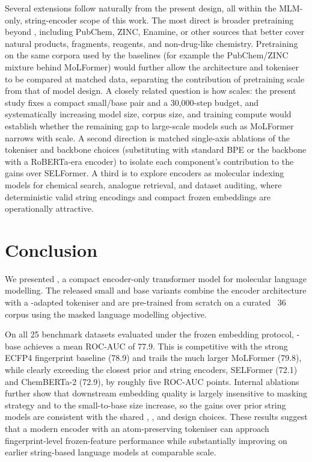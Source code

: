 \documentclass[11pt,a4paper]{article}
\begin{document}
Several extensions follow naturally from the present design, all within the
MLM-only, string-encoder scope of this work. The most direct is broader
pretraining beyond \chembl{}, including PubChem, ZINC, Enamine, or other
sources that better cover natural products, fragments, reagents, and
non-drug-like chemistry. Pretraining \model{} on the same corpora used by the
baselines (for example the PubChem/ZINC mixture behind MoLFormer) would
further allow the architecture and tokeniser to be compared at matched data,
separating the contribution of pretraining scale from that of model design. A
closely related question is how \model{} scales: the present study fixes a
compact small/base pair and a 30{,}000-step budget, and systematically
increasing model size, corpus size, and training compute would establish
whether the remaining gap to large-scale \smiles{} models such as MoLFormer
narrows with scale. A second direction is matched single-axis ablations
of the tokeniser and backbone choices (substituting \ape{} with standard BPE
or the \modernbert{} backbone with a RoBERTa-era encoder) to isolate each
component's contribution to the gains over SELFormer. A third is to explore
\selfies{} encoders as molecular indexing models for chemical search, analogue
retrieval, and dataset auditing, where deterministic valid string encodings and
compact frozen embeddings are operationally attractive.

\section{Conclusion}%
\label{sec:conclusion}

We presented \model{}, a compact encoder-only transformer model
for \selfies{} molecular language modelling. The released small and base variants combine the
\modernbert{} encoder architecture with a \selfies{}-adapted \ape{} tokeniser
and are pre-trained from scratch on a curated \chembl{}~36 corpus using the
masked language modelling objective.

On all 25 benchmark datasets evaluated under the frozen embedding
protocol, \model{}-base achieves a mean ROC-AUC of 77.9. This is competitive
with the strong ECFP4 fingerprint baseline (78.9) and trails the much larger
MoLFormer (79.8), while clearly exceeding the closest prior \selfies{} and
\smiles{} string encoders, SELFormer (72.1) and ChemBERTa-2 (72.9), by roughly
five ROC-AUC points. Internal ablations further show that downstream
embedding quality is largely insensitive to masking strategy and to the
small-to-base size increase, so the gains over prior string models are
consistent with the shared \selfies{}, \ape{}, and \modernbert{} design choices.
These results suggest that a modern \selfies{} encoder with an atom-preserving
\ape{} tokeniser can approach fingerprint-level frozen-feature performance while substantially
improving on earlier string-based language models at comparable scale.
\end{document}
